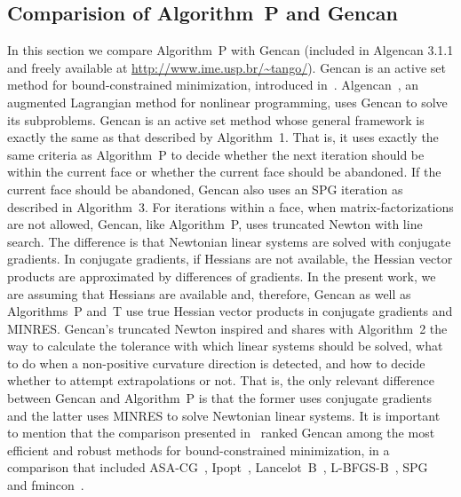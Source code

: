 \documentclass[11pt]{article}
\begin{document}
\subsection{Comparision of Algorithm~P and Gencan} \label{sec33}

In this section we compare Algorithm~P with Gencan (included in Algencan 3.1.1 and freely available at \url{http://www.ime.usp.br/~tango/}). Gencan is an active set method for bound-constrained minimization, introduced in~\cite{bmgencan}. Algencan~\cite{abmstango,bmbook,bmcomper}, an augmented Lagrangian method for nonlinear programming, uses Gencan to solve its subproblems. Gencan is an active set method whose general framework is exactly the same as that described by Algorithm~1. That is, it uses exactly the same criteria as Algorithm~P to decide whether the next iteration should be within the current face or whether the current face should be abandoned. If the current face should be abandoned, Gencan also uses an SPG iteration as described in Algorithm~3. For iterations within a face, when matrix-factorizations are not allowed, Gencan, like Algorithm~P, uses truncated Newton with line search. The difference is that Newtonian linear systems are solved with conjugate gradients. In conjugate gradients, if Hessians are not available, the Hessian vector products are approximated by differences of gradients. In the present work, we are assuming that Hessians are available and, therefore, Gencan as well as Algorithms~P and~T use true Hessian vector products in conjugate gradients and MINRES. Gencan's truncated Newton inspired and shares with Algorithm~2 the way to calculate the tolerance with which linear systems should be solved, what to do when a non-positive curvature direction is detected, and how to decide whether to attempt extrapolations or not. That is, the only relevant difference between Gencan and Algorithm~P is that the former uses conjugate gradients and the latter uses MINRES to solve Newtonian linear systems. It is important to mention that the comparison presented in~\cite{bg} ranked Gencan among the most efficient and robust methods for bound-constrained minimization, in a comparison that included ASA-CG~\cite{asacg}, Ipopt~\cite{ipopt}, Lancelot~B~\cite{Conn1992}, L-BFGS-B~\cite{lbfgsb3}, SPG~\cite{Birgin2000} and fmincon~\cite{Coleman1994,Coleman1996}.
\end{document}
